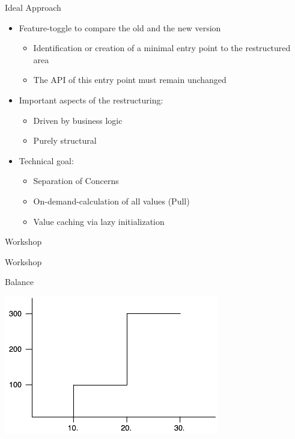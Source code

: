 \begin{frame}[fragile]{Ideal Approach}
\begin{itemize}
\item Feature-toggle to compare the old and the new version
\begin{itemize}
\item Identification or creation of a minimal entry point to the restructured area
\item The API of this entry point must remain unchanged
\end{itemize}
\end{itemize}

\begin{itemize}
\item Important aspects of the restructuring:
\begin{itemize}
\item Driven by business logic
\item Purely structural
\end{itemize}
\end{itemize}

\begin{itemize}
\item Technical goal:
\begin{itemize}
\item Separation of Concerns
\item On-demand-calculation of all values (\glqq Pull\grqq{})
\item Value caching via lazy initialization
\end{itemize}

\end{itemize}
\end{frame}


\begin{frame}[fragile]{Workshop}

\begin{center}
{\huge Workshop}
\end{center}
\end{frame}

\begin{frame}[fragile]{Balance}
\begin{center}
\includegraphics[width=.85 \paperwidth]{../workshopMaterial/balance.jpg}
\end{center}
\end{frame}

